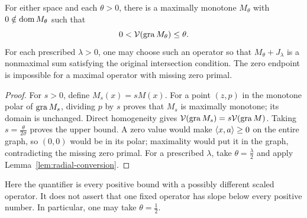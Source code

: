 \begin{corollary}\label{cor:flat}
For either space and each $\theta>0$, there is a maximally monotone
$M_\theta$ with $0\notin\operatorname{dom} M_\theta$ such that
\[
0<\mathcal V(\operatorname{gra} M_\theta)\le\theta.
\]
For each prescribed $\lambda>0$, one may choose such an operator so
that $M_\theta+J_\lambda$ is a nonmaximal sum satisfying the original
intersection condition. The zero endpoint is impossible for a maximal
operator with missing zero primal.
\end{corollary}
\begin{proof}
For $s>0$, define $M_s(x)=sM(x)$. For a point $(z,p)$ in the monotone polar of $\operatorname{gra} M_s$, dividing $p$ by $s$ proves that $M_s$ is maximally monotone; its domain
is unchanged. Direct homogeneity gives
$\mathcal V(\operatorname{gra} M_s)=s\mathcal V(\operatorname{gra} M)$.
Taking $s=\frac{\theta}{2\sigma}$ proves the upper bound. A zero value would
make $\langle x,a\rangle\ge0$ on the entire graph, so $(0,0)$ would be in
its polar; maximality would put it in the graph, contradicting the
missing zero primal. For a prescribed $\lambda$, take
$\theta=\frac{\lambda}{2}$ and apply Lemma~\ref{lem:radial-conversion}.
\end{proof}
Here the quantifier is every positive bound with a possibly different
scaled operator. It does not assert that one fixed operator has slope
below every positive number. In particular, one may take $\theta=\frac{1}{2}$.

